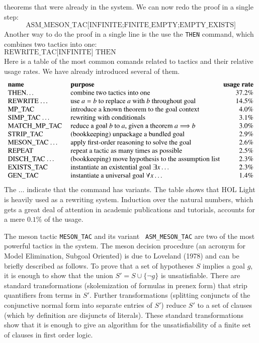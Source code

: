 \documentclass{llncs}
\begin{document}
theorems that were already in the system.  We can now redo the proof
in a single step:
\[
\text{ASM\_MESON\_TAC[INFINITE;FINITE\_EMPTY;EMPTY\_EXISTS]}
\]
Another way to do the proof in a single line is the use the {\tt THEN} command,
which combines two tactics into one:
\[
\text{REWRITE\_TAC[INFINITE] THEN ASM\_MESON\_TAC[FINITE\_EMPTY;EMPTY\_EXISTS]}
\]
Here is a table of the most common comands related to tactics and their relative 
usage rates.  We have already introduced several of them.
\[
\begin{array}{llr}
\text{\bf name}  &~\text{\bf purpose} &\text{\bf usage rate}\\
\text{THEN\dots }   &~\text{combine two tactics into one}   & 37.2\%\\
\text{REWRITE \dots} &~\text{use $a=b$ to replace $a$ with $b$ throughout goal} & 14.5\%\\
\text{MP\_TAC} &~\text{introduce a known theorem to the goal context} &4.0\%\\
\text{SIMP\_TAC \dots}&~\text{rewriting with conditionals} & 3.1\%\\
\text{MATCH\_MP\_TAC} &~\text{reduce a goal $b$ to $a$, given a theorem $a\Longrightarrow b$}& 3.0\%\\
\text{STRIP\_TAC} &~\text{(bookkeeping) unpackage a bundled goal} & 2.9\%\\
\text{MESON\_TAC \dots}&~\text{apply first-order reasoning to solve the goal} & 2.6\%\\
\text{REPEAT} &~\text{repeat a tactic as many times as possible} & 2.5\%\\
\text{DISCH\_TAC \dots}&~\text{(bookkeeping) move hypothesis to the assumption list\!\!\!} & 2.3\%\\
\text{EXISTS\_TAC}&~\text{instantiate an existential goal $\exists x\dots$}& 2.3\%\\
\text{GEN\_TAC}&~\text{instantiate a universal goal $\forall x\dots$}& 1.4\%
\end{array}
\]
The $\dots$ indicate that the command has variants.  The table shows
that HOL Light is heavily used as a rewriting system.  Induction over
the natural numbers, which gets a great deal of attention in academic
publications and tutorials, accounts for a mere $0.1\%$ of the usage.

The meson tactic {\tt MESON\_TAC} and its variant {\tt
  ASM\_MESON\_TAC} are two of the most powerful tactics in the system.
  The meson decision procedure (an
acronym for Model Elimination, Subgoal Oriented) is due to Loveland
(1978) and can be briefly described as follows.  To prove that a set
of hypotheses $S$ implies a goal $g$, it is enough to show that the
union $S' = S \cup \{\lnot g\}$ is unsatisfiable.  There are standard
transformations (skolemization of formulas in prenex form) that strip
quantifiers from terms in $S'$.  Further transformations (splitting
conjuncts of the conjunctive normal form into separate entries of
$S'$) reduce $S'$ to a set of clauses (which by definition are
disjuncts of literals).  These standard transformations show that it
is enough to give an algorithm for the unsatisfiability of a finite
set of clauses in first order logic.
\end{document}
